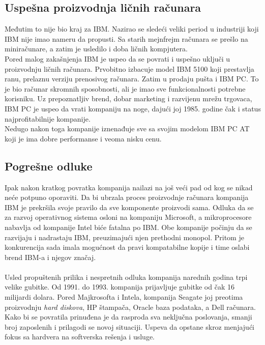 \documentclass[a4paper]{article}
\begin{document}
\subsection{Uspešna proizvodnja ličnih računara}
Međutim to nije bio kraj za IBM. Nazirao se sledeći veliki period u industriji koji IBM nije imao nameru da propusti. Sa starih mejnfrejm računara se prešlo na miniračunare, a zatim je usledilo i doba ličnih kompjutera. \\Pored malog zakašnjenja IBM je uspeo da se povrati i uspešno uključi u proizvodnju ličnih računara. Prvobitno izbacuje model IBM 5100 koji prestavlja ranu, prelaznu verziju prenosivog računara. Zatim u prodaju pušta i IBM PC. To je bio računar skromnih sposobnosti, ali je imao sve funkcionalnosti potrebne korisniku. Uz prepoznatljiv brend, dobar marketing i razvijenu mrežu trgovaca, IBM PC je uspeo da vrati kompaniju na noge, dajući joj 1985. godine čak i status najprofitabilnije kompanije.%
 \\Nedugo nakon toga kompanije iznenađuje sve sa svojim modelom IBM PC AT koji je ima dobre performanse i veoma nisku cenu. 
\subsection{Pogrešne odluke}
Ipak nakon kratkog povratka kompanija nailazi na još veći pad od kog se nikad neće potpuno oporaviti. %
Da bi ubrzala proces proizvodnje računara kompanija IBM je prekršila svoje pravilo da sve komponente proizvodi sama. Odluka da se za razvoj operativnog sistema osloni na kompaniju Microsoft, a mikroprocesore nabavlja od kompanije Intel biće fatalna po IBM. Obe kompanije počinju da se razvijaju i nadrastaju IBM, preuzimajući njen prethodni monopol. Pritom je konkurencija sada imala mogućnost da pravi kompatabilne kopije i time oslabi brend IBM-a i njegov značaj. \\ \\
Usled propuštenih prilika i nespretnih odluka kompanija narednih godina trpi velike gubitke. Od 1991. do 1993. kompanija prijavljuje gubitke od čak 16 milijardi dolara. Pored Majkrosofta i Intela, kompanija Seagate joj preotima proizvodnju \emph{hard diskova}, HP štampača, Oracle baza podataka, a Dell računara. \\ 
Kako bi se povratila prinuđena je da rasproda sva neključna poslovanja, smanji broj zaposlenih i prilagodi se novoj situaciji. Uspeva da opstane skroz menjajući fokus sa hardvera na softverska rešenja i usluge.
\end{document}
